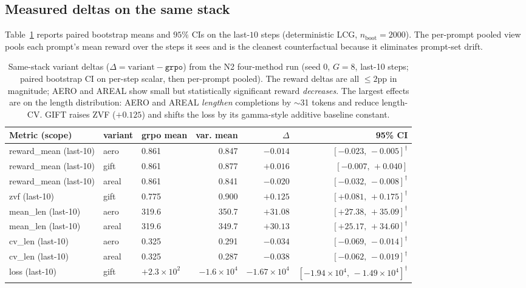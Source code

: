 \documentclass{article}
\begin{document}
\subsection{Measured deltas on the same stack}
Table~\ref{tab:p6-measured-deltas} reports paired bootstrap means and
$95\%$ CIs on the last-$10$ steps (deterministic LCG, $n_{\text{boot}}=2000$).
The per-prompt pooled view pools each prompt's mean reward over the steps
it sees and is the cleanest counterfactual because it eliminates
prompt-set drift.

\begin{table}[t]
\centering
\caption{Same-stack variant deltas ($\Delta = \text{variant} - \texttt{grpo}$)
from the N2 four-method run (seed $0$, $G{=}8$, last-10 steps; paired
bootstrap CI on per-step scalar, then per-prompt pooled). The reward
deltas are all $\leq 2$pp in magnitude; AERO and AREAL show small but
statistically significant reward \emph{decreases}. The largest effects
are on the length distribution: AERO and AREAL \emph{lengthen}
completions by $\sim$31 tokens and reduce length-CV. GIFT raises ZVF
($+0.125$) and shifts the loss by its gamma-style additive baseline
constant.}
\label{tab:p6-measured-deltas}
\small
\begin{tabular}{lllrrr}
\toprule
Metric (scope)        & variant & grpo mean & var. mean & $\Delta$ & 95\% CI \\
\midrule
reward\_mean (last-10) & aero    & 0.861 & 0.847 & $-0.014$  & $[-0.023,\,-0.005]^{\dagger}$ \\
reward\_mean (last-10) & gift    & 0.861 & 0.877 & $+0.016$  & $[-0.007,\,+0.040]$ \\
reward\_mean (last-10) & areal   & 0.861 & 0.841 & $-0.020$  & $[-0.032,\,-0.008]^{\dagger}$ \\
zvf (last-10)          & gift    & 0.775 & 0.900 & $+0.125$  & $[+0.081,\,+0.175]^{\dagger}$ \\
mean\_len (last-10)    & aero    & 319.6 & 350.7 & $+31.08$  & $[+27.38,\,+35.09]^{\dagger}$ \\
mean\_len (last-10)    & areal   & 319.6 & 349.7 & $+30.13$  & $[+25.17,\,+34.60]^{\dagger}$ \\
cv\_len (last-10)      & aero    & 0.325 & 0.291 & $-0.034$  & $[-0.069,\,-0.014]^{\dagger}$ \\
cv\_len (last-10)      & areal   & 0.325 & 0.287 & $-0.038$  & $[-0.062,\,-0.019]^{\dagger}$ \\
loss (last-10)         & gift    & $+2.3\!\times\!10^{2}$ & $-1.6\!\times\!10^{4}$ & $-1.67\!\times\!10^{4}$ & $[-1.94\!\times\!10^{4},\,-1.49\!\times\!10^{4}]^{\dagger}$ \\

\end{tabular}
\end{table}
\end{document}
